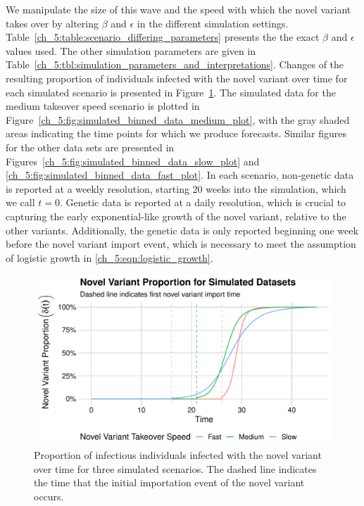 We manipulate the size of this wave and the speed with which the novel variant takes over by altering \( \beta \) and \( \epsilon \) in the different simulation settings.
Table~\ref{ch_5:table:scenario_differing_parameters} presents the  the exact \( \beta \) and \( \epsilon \) values used.
The other simulation parameters are given in Table~\ref{ch_5:tbl:simulation_parameters_and_interpretations}.
Changes of the resulting proportion of individuals infected with the novel variant over time for each simulated scenario is presented in Figure~\ref{ch_5:fig:proportion_novel_variant_simulated_data_plot}.
The simulated data for the medium takeover speed scenario is plotted in Figure~\ref{ch_5:fig:simulated_binned_data_medium_plot}, with the gray shaded areas indicating the time points for which we produce forecasts.
Similar figures for the other data sets are presented in Figures~\ref{ch_5:fig:simulated_binned_data_slow_plot} and \ref{ch_5:fig:simulated_binned_data_fast_plot}.
In each scenario, non-genetic data is reported at a weekly resolution, starting 20 weeks into the simulation, which we call \( t = 0 \).
Genetic data is reported at a daily resolution, which is crucial to capturing the early exponential-like growth of the novel variant, relative to the other variants.
Additionally, the genetic data is only reported beginning one week before the novel variant import event, which is necessary to meet the assumption of logistic growth in \eqref{ch_5:eqn:logistic_growth}.

\begin{figure}
    \centering
    \includegraphics[width=1.0\columnwidth]{proportion_novel_variant_simulated_data_plot}
    \caption[Proportion of infectious individuals infected with the novel variant over time for three simulated scenarios.]{Proportion of infectious individuals infected with the novel variant over time for three simulated scenarios.
    The dashed line indicates the time that the initial importation event of the novel variant occurs.}
    \label{ch_5:fig:proportion_novel_variant_simulated_data_plot}
\end{figure}

